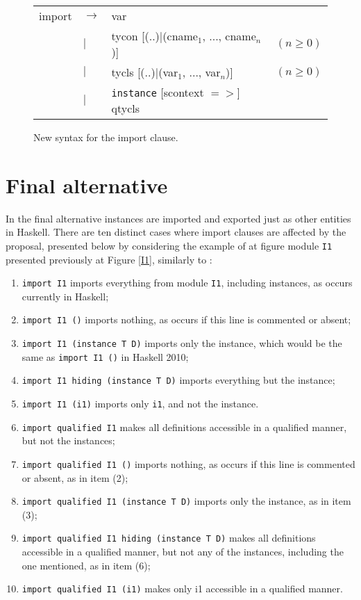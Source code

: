 \documentclass[msc]{ppgccufmg}
\begin{document}
\begin{figure}
\caption{New syntax for the import clause.\label{import}}
\begin{tabular}{|l l l l|}
\hline
import & $\to$ & var &\\
& $|$ & tycon [(..)$|$(cname$_1$, ..., cname$_n$)] & $(n \geq 0)$\\
& $|$ & tycls [(..)$|$(var$_1$, ..., var$_n$)] & $(n \geq 0)$\\
& $|$ & \texttt{instance} [scontext $=>$] qtycls &\\
\hline
\end{tabular}
\end{figure}

\section{Final alternative}
\label{final}
In the final alternative instances are imported and exported just as other entities in Haskell.  There are ten distinct
cases where import clauses are affected by the proposal, presented below by
considering the example of at figure  module
\texttt{I1} presented previously at Figure \ref{I1}, similarly to
\cite[section~5.3.4]{report}:
\begin{enumerate}
\item \texttt{import I1} imports everything from module \texttt{I1},
  including instances, as occurs currently in Haskell;
\item \texttt{import I1 ()} imports nothing, as occurs if this line
  is commented or absent;
\item \texttt{import I1 (instance T D)} imports only the instance, which
  would be the same as \texttt{import I1 ()} in Haskell 2010;
\item \texttt{import I1 hiding (instance T D)} imports everything but
  the instance;
\item \texttt{import I1 (i1)} imports only \texttt{i1}, and not the
  instance.
\item \texttt{import qualified I1} makes all definitions accessible in a
  qualified manner, but not the instances;
\item \texttt{import qualified I1 ()} imports nothing, as occurs if this line is
  commented or absent, as in item (2);
\item \texttt{import qualified I1 (instance T D)} imports only the instance,
  as in item (3);
\item \texttt{import qualified I1 hiding (instance T D)} makes all definitions
  accessible in a qualified manner, but not any of the instances, including the
  one mentioned, as in item (6);
\item \texttt{import qualified I1 (i1)} makes only i1 accessible in a qualified
  manner.
\end{enumerate}
\end{document}
